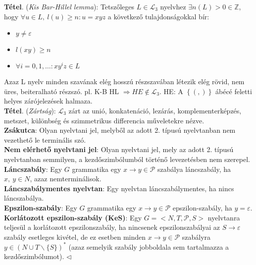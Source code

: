 \documentclass[12pt,margin=0px]{article}
\begin{document}
    \noindent \textbf{Tétel}. (\emph{Kis Bar-Hillel lemma}): Tetszőleges $L \in \mathcal{L}_3$ nyelvhez $\exists n(L) > 0 \in \mathbb{Z}$, hogy $\forall u \in L,\ l(u) \geq n: u = xyz$ a következő tulajdonságokkal bír:
    \begin{itemize}
        \item $y \neq \varepsilon$
        \item $l(xy) \geq n$
        \item $\forall i = 0,1,\ldots: xy^{i}z \in L$
    \end{itemize}
    
    \noindent Azaz L nyelv minden szavának elég hosszú részszavában létezik elég rövid, nem üres, beiteralható részszó. pl. K-B HL $\Rightarrow HE \not \in \mathcal{L}_3$. HE: A $\left\{(,)\right\}$ ábécé feletti helyes zárójelezések halmaza.\\

    \noindent \textbf{Tétel}. (\emph{Zártság}): $\mathcal{L}_3$ zárt az unió, konkatenáció, lezárás, komplementerképzés, metszet, különbség és szimmetrikus differencia műveletekre nézve.\\

    {\footnotesize \noindent {\color{blue} \faLightbulbO\ $\triangleright$ } }
    {\footnotesize
    \noindent \textbf{Zsákutca}: Olyan nyelvtani jel, melyből az adott 2. típusú nyelvtanban nem vezethető le terminális szó.\\

    \noindent \textbf{Nem elérhető nyelvtani jel}: Olyan nyelvtani jel, mely az adott 2. típusú nyelvtanban semmilyen, a kezdőszimbólumból történő levezetésben nem szerepel.\\

    \noindent \textbf{Láncszabály}: Egy $G$ grammatika egy $x \to y \in \mathcal{P}$ szabálya láncszabály, ha $x,\ y \in N$, azaz nemterminálisok.\\

    \noindent \textbf{Láncszabálymentes nyelvtan}: Egy nyelvtan láncszabálymentes, ha nincs láncszabálya.\\

    \noindent \textbf{Epszilon-szabály}: Egy $G$ grammatika egy $x \to y \in \mathcal{P}$ epszilon-szabály, ha $y = \varepsilon$.\\

    \noindent \textbf{Korlátozott epszilon-szabály (KeS)}: Egy $G = \Big<N,T,\mathcal{P},S\Big>$ nyelvtanra teljesül a korlátozott epszilonszabály, ha nincsenek epszilonszabályai az $S \to \varepsilon$ szabály esetleges kivétel, de ez esetben minden $x \to y \in \mathcal{P}$ szabályra $y \in (N \cup T \backslash \{S\})^{*}$ (azaz semelyik szabály jobboldala sem tartalmazza a kezdőszimbólumot).
    $\triangleleft$ \faLightbulbO}\\    
\end{document}
